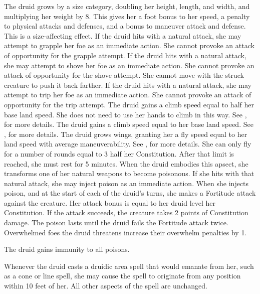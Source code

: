  The druid grows by a size category, doubling her height, length, and width, and multiplying her weight by 8. This gives her a  foot bonus to her speed, a  penalty to physical attacks and defenses, and a  bonus to maneuver attack and defense. This is a size-affecting effect.
 If the druid hits with a natural attack, she may attempt to grapple her foe as an immediate action. She cannot provoke an attack of opportunity for the grapple attempt.
 If the druid hits with a natural attack, she may attempt to shove her foe as an immediate action. She cannot provoke an attack of opportunity for the shove attempt. She cannot move with the struck creature to push it back farther. 
 If the druid hits with a natural attack, she may attempt to trip her foe as an immediate action. She cannot provoke an attack of opportunity for the trip attempt.
 The druid gains a climb speed equal to half her base land speed. She does not need to use her hands to climb in this way. See , for more details.
 The druid gains a climb speed equal to her base land speed. See , for more details.
 The druid grows wings, granting her a fly speed equal to her land speed with average maneuverability. See , for more details. She can only fly for a number of rounds equal to 3 \add half her Constitution. After that limit is reached, she must rest for 5 minutes.
 When the druid embodies this apsect, she transforms one of her natural weapons to become poisonous. If she hits with that natural attack, she may inject poison as an immediate action. When she injects poison, and at the start of each of the druid's turns, she makes a Fortitude attack against the creature. Her attack bonus is equal to her druid level \add her Constitution. If the attack succeeds, the creature takes 2 points of Constitution damage. The poison lasts until the druid fails the Fortitude attack twice.
 Overwhelmed foes the druid threatens increase their overwhelm penalties by 1.

 The druid gains immunity to all poisons.

 Whenever the druid casts a druidic area spell that would emanate from her, such as a cone or line spell, she may cause the spell to originate from any position within 10 feet of her. All other aspects of the spell are unchanged.

